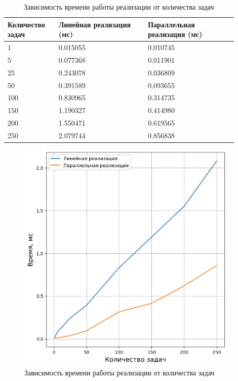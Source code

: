 \begin{table}[h]
    \begin{center}
    \begin{threeparttable}
        \captionsetup{justification=raggedright}
        \caption{\label{tab:research}Зависимость времени работы реализации от количества задач}
        \begin{tabular}{|p{0.2\linewidth}|p{0.35\linewidth}|p{0.35\linewidth}|}
            \hline
            \bfseries Количество задач & \bfseries Линейная \newline реализация (мс) & \bfseries Параллельная \newline реализация (мс) \\
            \hline
            1 & 0.015055 & 0.010745 \\
            \hline
            5 & 0.077368 & 0.011901 \\
            \hline
            25 & 0.243078 & 0.036809 \\
            \hline
            50 & 0.391589 & 0.093655 \\
            \hline
            100 & 0.830965 & 0.314735 \\
            \hline
            150 & 1.190327 & 0.414980 \\
            \hline
            200 & 1.550471 & 0.619565 \\
            \hline
            250 & 2.079744 & 0.856838 \\
            \hline
        \end{tabular}
    \end{threeparttable}
    \end{center}
\end{table} 
\clearpage

\begin{figure}[h!btp]
	\centering
	\includegraphics[width=300pt]{inc/research.png}
	\caption{Зависимость времени работы реализации от количества задач}
	\label{fig:research}	
\end{figure}

